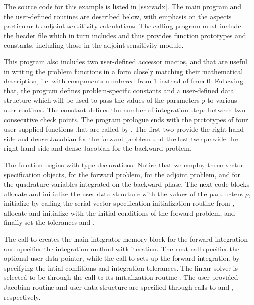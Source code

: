 The source code for this example is listed in \A\ref{ss:cvadx}.
The main program and the user-defined routines are described below, 
with emphasis on the aspects particular to adjoint sensitivity calculations.
The calling program must include the {\cvodes} header file  which
in turn includes  and thus provides {\cvodes} function prototypes
and constants, including those in the adjoint sensitivity module.
 
This program also includes two user-defined accessor macros,
 and 
that are useful in writing the problem functions in a form closely
matching their mathematical description, i.e. with components numbered from 1 instead of from 0. 
Following that, the program defines problem-specific constants and a user-defined 
data structure which will be used to pass the values of the parameters $p$ to various
user routines. The constant  defines the number of integration steps
between two consecutive check points.
The program prologue ends with the prototypes of four user-supplied functions that are
called by {\cvodes}. The first two provide the right hand side and dense Jacobian
for the forward problem and the last two provide the right hand side and dense Jacobian 
for the backward problem.

The  function begins with type declarations. Notice that we employ three vector
specification objects,  for the forward problem,  for
the adjoint problem, and  for the quadrature variables integrated on
the backward phase. The next code blocks allocate and initialize the user data
structure with the values of the parameters $p$, initialize  by calling
the serial vector specification initialization routine from {\nvecs}, allocate and
initialize  with the initial conditions of the forward problem, and finally
set the tolerances  and .

The call to  creates the main integrator memory block for the 
forward integration and specifies the  integration method with  
iteration. 
The next call specifies the optional user data pointer, while the call to  
sets-up the forward integration by specifying the intial conditions and integration 
tolerances. The linear solver is selected to be {\cvdense} through the call to its 
initialization routine . The user provided Jacobian routine 
and user data structure  are specified through calls to  and
, respectively.

